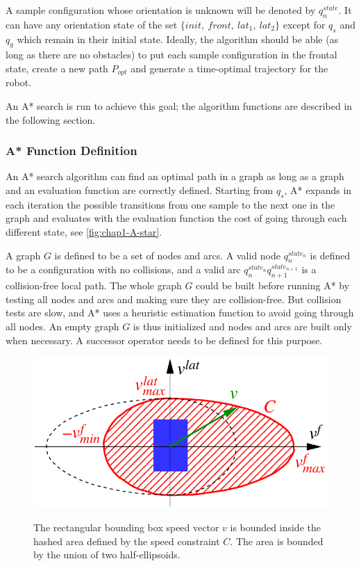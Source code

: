 A sample configuration whose orientation is unknown will be denoted by
$q_n^{state}$. It can have any orientation state of the set
$\{init,~front,~lat_1,~lat_2\}$ except for $q_s$ and $q_g$ which
remain in their initial state.  Ideally, the algorithm should be able
(as long as there are no obstacles) to put each sample configuration
in the frontal state, create a new path $P_{opt}$ and generate a
time-optimal trajectory for the robot.

An A* search is run to achieve this goal; the algorithm functions are
described in the following section.

\subsubsection{A* Function Definition}
\label{sec:chap1-A-star}
An A* search algorithm can find an optimal path in a graph
as long as a graph and an evaluation function are correctly
defined. Starting from $q_s$, A* expands in each iteration the
possible transitions from one sample to the next one in the graph and
evaluates with the evaluation function the cost of going through each
different state, see \autoref{fig:chap1-A-star}.

A graph $G$ is defined to be a set of nodes and arcs. A valid node
$q_n^{state_n}$ is defined to be a configuration with no collisions,
and a valid arc $q_n^{state_n}q_{n+1}^{state_{n+1}}$ is a
collision-free local path. The whole graph $G$ could be built before
running A* by testing all nodes and arcs and making sure they are
collision-free. But collision tests are slow, and A* uses a heuristic
estimation function to avoid going through all nodes. An empty graph
$G$ is thus initialized and nodes and arcs are built only when
necessary. A successor operator needs to be defined for this purpose.

\begin{figure}
  \centering
      {\includegraphics[width = 0.75\linewidth]
        {src/chap1-path-optimization/elliptic-constraint.pdf}}
      \caption{The rectangular bounding box speed vector $v$ is
        bounded inside the hashed area defined by the speed constraint
        $C$. The area is bounded by the union of two half-ellipsoids.}
      \label{fig:chap1-elliptic-constraint}
\end{figure}

